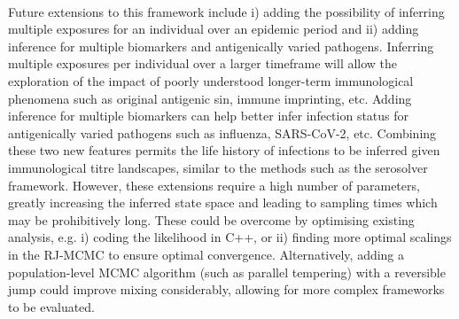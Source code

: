 \paragraph{}Future extensions to this framework include i) adding the possibility of inferring multiple exposures for an individual over an epidemic period and ii) adding inference for multiple biomarkers and antigenically varied pathogens. Inferring multiple exposures per individual over a larger timeframe will allow the exploration of the impact of poorly understood longer-term immunological phenomena such as original antigenic sin, immune imprinting, etc. Adding inference for multiple biomarkers can help better infer infection status for antigenically varied pathogens such as influenza, SARS-CoV-2, etc. Combining these two new features permits the life history of infections to be inferred given immunological titre landscapes, similar to the methods such as the serosolver framework\cite{Hay2020-pr}. However, these extensions require a high number of parameters, greatly increasing the inferred state space and leading to sampling times which may be prohibitively long. These could be overcome by optimising existing analysis, e.g. i) coding the likelihood in C++, or ii) finding more optimal scalings in the RJ-MCMC to ensure optimal convergence. Alternatively, adding a population-level MCMC algorithm (such as parallel tempering) with a reversible jump could improve mixing considerably, allowing for more complex frameworks to be evaluated.



